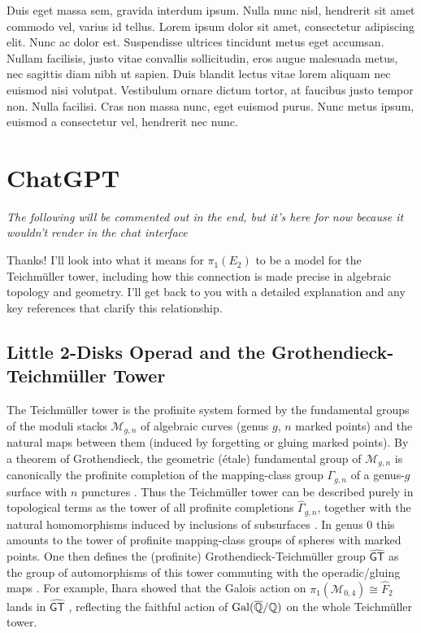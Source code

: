 Duis eget massa sem, gravida interdum ipsum. Nulla nunc nisl, hendrerit sit amet commodo vel, varius id tellus. Lorem ipsum dolor sit amet, consectetur adipiscing elit. Nunc ac dolor est. Suspendisse ultrices tincidunt metus eget accumsan. Nullam facilisis, justo vitae convallis sollicitudin, eros augue malesuada metus, nec sagittis diam nibh ut sapien. Duis blandit lectus vitae lorem aliquam nec euismod nisi volutpat. Vestibulum ornare dictum tortor, at faucibus justo tempor non. Nulla facilisi. Cras non massa nunc, eget euismod purus. Nunc metus ipsum, euismod a consectetur vel, hendrerit nec nunc.
\section{ChatGPT}
\emph{The following will be commented out in the end, but it's here for now because it wouldn't render in the chat interface}

Thanks! I'll look into what it means for $\pi_1(E_2)$ to be a model for the Teichm\"uller tower, including how this connection is made precise in algebraic topology and geometry.
I'll get back to you with a detailed explanation and any key references that clarify this relationship.


\subsection{Little 2-Disks Operad and the Grothendieck-Teichm\"uller Tower}

The Teichm\"uller tower is the profinite system formed by the fundamental groups of the moduli stacks $\mathcal{M}_{g,n}$ of algebraic curves (genus $g$, $n$ marked points) and the natural maps between them (induced by forgetting or gluing marked points).  By a theorem of Grothendieck, the geometric (\'etale) fundamental group of $\mathcal{M}_{g,n}$ is canonically the profinite completion of the mapping-class group $\Gamma_{g,n}$ of a genus-$g$ surface with $n$ punctures \cite{de_brito_operads_2019}. Thus the Teichm\"uller tower can be described purely in topological terms as the tower of all profinite completions $\widehat\Gamma_{g,n}$, together with the natural homomorphisms induced by inclusions of subsurfaces \cite{borghi_lecture_2025}. In genus 0 this amounts to the tower of profinite mapping-class groups of spheres with marked points.  One then defines the (profinite) Grothendieck-Teichm\"uller group $\widehat{\mathsf{GT}}$ as the group of automorphisms of this tower commuting with the operadic/gluing maps \cite{de_brito_operads_2019}. For example, Ihara showed that the Galois action on $\pi_1(\mathcal{M}_{0,4})\cong\widehat F_2$ lands in $\widehat{\mathsf{GT}}$ \cite{de_brito_operads_2019}, reflecting the faithful action of $\mathrm{Gal}(\overline{\mathbb{Q}}/\mathbb{Q})$ on the whole Teichm\"uller tower.

